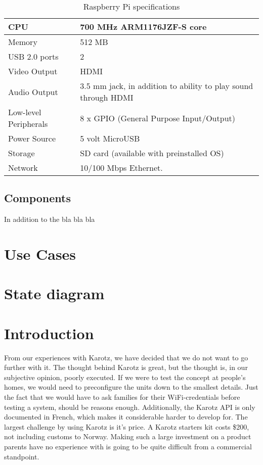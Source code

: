 \begin{table}
\begin{tabular}{|p{5.0cm} | p{5.0cm} |}
\hline
CPU & 700 MHz ARM1176JZF-S core \\
\hline
Memory & 512 MB \\
\hline
USB 2.0 ports & 2 \\
\hline
Video Output & HDMI \\
\hline
Audio Output & 3.5 mm jack, in addition to ability to play sound through HDMI \\
\hline
Low-level Peripherals & 8 x GPIO (General Purpose Input/Output) \\
\hline
Power Source & 5 volt MicroUSB \\
\hline
Storage & SD card (available with preinstalled OS) \\
\hline
Network & 10/100 Mbps Ethernet.  \\
\hline
\end{tabular}
\caption{Raspberry Pi specifications}
\label{tab:pi-specs}
\end{table}

  
\subsection{Components}
In addition to the \rpi{} bla bla bla

\section{Use Cases} 


\section{State diagram}



\section{Introduction}
\label{sec:our-solution-introduction}
From our experiences with Karotz, we have decided that we do not want to go further with it. The thought behind Karotz is great, but the thought is, in our subjective opinion, poorly executed. If we were to test the concept at people's homes, we would need to preconfigure the units down to the smallest details. Just the fact that we would have to ask families for their WiFi-credentials before testing a system, should be reasons enough.
Additionally, the Karotz API is only documented in French, which makes it considerable harder to develop for. The largest challenge by using Karotz is it's price. A Karotz starters kit costs \$200, not including customs to Norway. Making such a large investment on a product parents have no experience with is going to be quite difficult from a commercial standpoint.  




